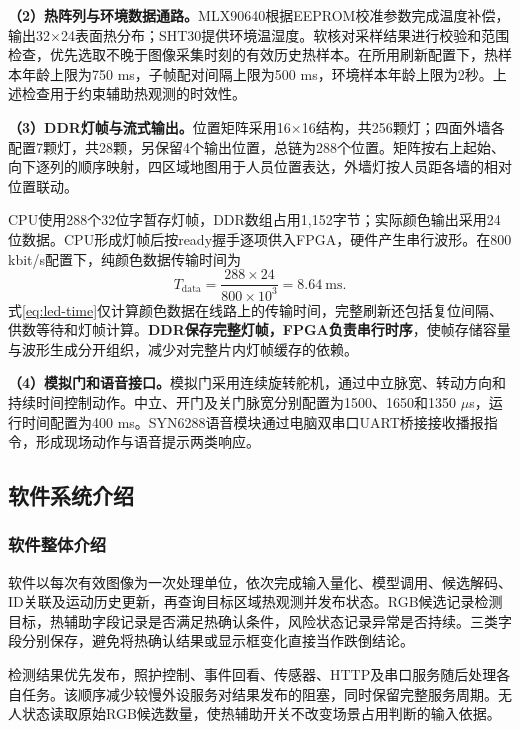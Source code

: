 \documentclass[UTF8,a4paper,zihao=-4,fontset=none,scheme=plain]{ctexart}
\begin{document}
\textbf{（2）热阵列与环境数据通路。}MLX90640根据EEPROM校准参数完成温度补偿，输出32×24表面热分布；SHT30提供环境温湿度。软核对采样结果进行校验和范围检查，优先选取不晚于图像采集时刻的有效历史热样本。在所用刷新配置下，热样本年龄上限为750 ms，子帧配对间隔上限为500 ms，环境样本年龄上限为2秒。上述检查用于约束辅助热观测的时效性。

\textbf{（3）DDR灯帧与流式输出。}位置矩阵采用16×16结构，共256颗灯；四面外墙各配置7颗灯，共28颗，另保留4个输出位置，总链为288个位置。矩阵按右上起始、向下逐列的顺序映射，四区域地图用于人员位置表达，外墙灯按人员距各墙的相对位置联动。

CPU使用288个32位字暂存灯帧，DDR数组占用1,152字节；实际颜色输出采用24位数据。CPU形成灯帧后按ready握手逐项供入FPGA，硬件产生串行波形。在800 kbit/s配置下，纯颜色数据传输时间为
\begin{equation}
 T_{\mathrm{data}}=\frac{288\times24}{800\times10^3}=8.64\ \mathrm{ms}.
 \label{eq:led-time}
\end{equation}
式\eqref{eq:led-time}仅计算颜色数据在线路上的传输时间，完整刷新还包括复位间隔、供数等待和灯帧计算。\textbf{DDR保存完整灯帧，FPGA负责串行时序}，使帧存储容量与波形生成分开组织，减少对完整片内灯帧缓存的依赖。

\textbf{（4）模拟门和语音接口。}模拟门采用连续旋转舵机，通过中立脉宽、转动方向和持续时间控制动作。中立、开门及关门脉宽分别配置为1500、1650和1350 $\mu$s，运行时间配置为400 ms。SYN6288语音模块\cite{syn}通过电脑双串口UART桥接接收播报指令，形成现场动作与语音提示两类响应。

\subsection{软件系统介绍}
\subsubsection{软件整体介绍}
软件以每次有效图像为一次处理单位，依次完成输入量化、模型调用、候选解码、ID关联及运动历史更新，再查询目标区域热观测并发布状态。RGB候选记录检测目标，热辅助字段记录是否满足热确认条件，风险状态记录异常是否持续。三类字段分别保存，避免将热确认结果或显示框变化直接当作跌倒结论。

检测结果优先发布，照护控制、事件回看、传感器、HTTP及串口服务随后处理各自任务。该顺序减少较慢外设服务对结果发布的阻塞，同时保留完整服务周期。无人状态读取原始RGB候选数量，使热辅助开关不改变场景占用判断的输入依据。
\end{document}

